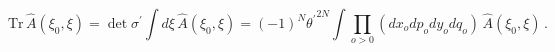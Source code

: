 \begin{equation}
\mathrm{Tr}\,\hat{A}(\xi _{0},\xi )=\det \sigma ^{\prime }
\int d\xi \,\hat{A}(\xi _{0},\xi )=(-1)^{N}{\theta ^{\prime }}%
^{2N}\int \prod_{o>0}\left( dx_{o}dp_{o}dy_{o}dq_{o}\right) \,\hat{A}(\xi
_{0},\xi )\,.  \label{eq:tracedef}
\end{equation}

